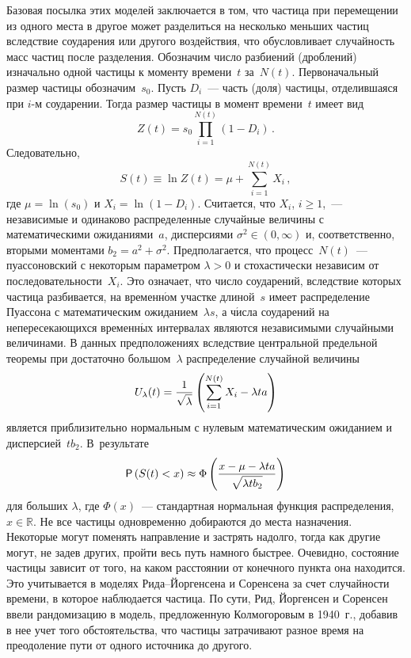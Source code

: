 \begin{multicols}{2}
Базовая посылка этих моделей заключается в том, что частица при
перемещении из одного места в другое может разделиться на
несколько меньших частиц вследствие соударения или другого
воздействия, что обусловливает случайность масс частиц после
разделения. Обозначим число разбиений (дроблений) изначально одной
частицы к моменту времени~$t$ за~$N(t)$. Первоначальный размер
частицы обозначим~$s_{0}$. Пусть $D_{i}$~--- часть (доля) частицы,
отделившаяся при $i$-м соударении. Тогда размер частицы в момент
времени~$t$ имеет вид
\begin{equation}
Z(t)=s_{0}\prod_{i=1}^{N(t)}(1-D_{i})\,.
\label{e1kk}
\end{equation}
Следовательно,
$$
S(t) \equiv
\ln Z(t)=\mu + \sum_{i=1}^{N(t)} X_{i}\,,
$$
где $\mu=\ln(s_{0})$ и $X_{i}=\ln(1-D_{i})$. Считается, что
$X_{i}$, $i\ge1$,~--- независимые и одинаково распределенные
случайные величины с математическими ожиданиями~$a$, дисперсиями
$\sigma^2\in(0,\infty)$ и, соответственно, вторыми моментами
$b_{2}=a^2+\sigma^2$. Предполагается, что процесс~$N(t)$~---
пуассоновский с некоторым параметром $\lambda>0$ и стохастически
независим от последовательности~$X_{i}$. Это означает, что число
соударений, вследствие которых частица разбивается, на
временн{$\acute{\mbox{о}}$}м участке длиной~$s$ имеет распределение Пуассона с
математическим ожиданием~$\lambda s$, а ч{$\acute{\mbox{и}}$}сла соударений на
непересекающихся временн{$\acute{\mbox{ы}}$}х интервалах являются независимыми
случайными величинами. В данных предположениях вследствие
центральной предельной теоремы при достаточно большом~$\lambda$
распределение случайной величины
$$
U_{\lambda}(t)=
\displaystyle\frac{\displaystyle 1\mathstrut}{\displaystyle \sqrt{\lambda}\mathstrut}\left(\sum\limits_{i=1}^{N(t)}X_{i}-\lambda t
a\right )
$$
является приблизительно нормальным с нулевым математическим
ожиданием и дисперсией~$tb_{2}$. В~результате
\begin{equation}
{\sf P}\left(S(t)<x\right)\approx\Phi\left(\displaystyle\frac{\displaystyle x-\mu-\lambda t
a\mathstrut}{\displaystyle \sqrt{\lambda t b_{2}}\mathstrut}\right)
\label{e2kk}
\end{equation}
для больших $\lambda$, где $\Phi(x)$~--- стандартная нормальная
функция распределения, $x\in\mathbb{R}$. Не все час\-ти\-цы\linebreak
одновременно добираются до места назначения. Некоторые могут
поменять направление и застрять надолго, тогда как другие могут,
не задев других, \mbox{пройти} весь путь намного быстрее. Очевидно,
состояние частицы зависит от того, на каком расстоянии от
конечного пункта она находится. Это учитывается в моделях
Рида--Йоргенсена и Соренсена за счет случайности времени, в
которое наблюдается частица. По сути, Рид, Йоргенсен и Соренсен
ввели рандомизацию в модель, предложенную Колмогоровым в 1940~г.,
добавив в нее учет того обстоятельства, что частицы затрачивают
разное время на преодоление пути от одного источника до другого.


\end{multicols}
